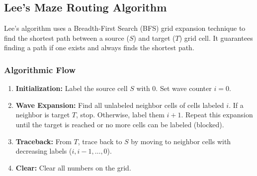 \documentclass[12pt,a4paper]{article}
\begin{document}
\subsection{Lee's Maze Routing Algorithm}
Lee's algorithm uses a Breadth-First Search (BFS) grid expansion technique to find the shortest path between a source ($S$) and target ($T$) grid cell. It guarantees finding a path if one exists and always finds the shortest path.

\subsubsection{Algorithmic Flow}
\begin{enumerate}[leftmargin=*, itemsep=2pt]
  \item \textbf{Initialization:} Label the source cell $S$ with $0$. Set wave counter $i = 0$.
  \item \textbf{Wave Expansion:} Find all unlabeled neighbor cells of cells labeled $i$. If a neighbor is target $T$, stop. Otherwise, label them $i+1$. Repeat this expansion until the target is reached or no more cells can be labeled (blocked).
  \item \textbf{Traceback:} From $T$, trace back to $S$ by moving to neighbor cells with decreasing labels ($i, i-1, \dots, 0$).
  \item \textbf{Clear:} Clear all numbers on the grid.
\end{enumerate}
\end{document}
